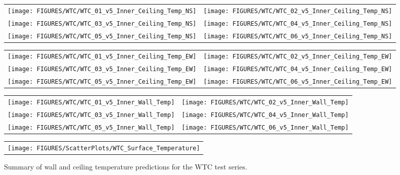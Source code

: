 \begin{figure}[p]
\begin{tabular*}{\textwidth}{l@{\extracolsep{\fill}}r}
\texttt{[image: FIGURES/WTC/WTC\_01\_v5\_Inner\_Ceiling\_Temp\_NS]} &
\texttt{[image: FIGURES/WTC/WTC\_02\_v5\_Inner\_Ceiling\_Temp\_NS]} \\
\texttt{[image: FIGURES/WTC/WTC\_03\_v5\_Inner\_Ceiling\_Temp\_NS]} &
\texttt{[image: FIGURES/WTC/WTC\_04\_v5\_Inner\_Ceiling\_Temp\_NS]} \\
\texttt{[image: FIGURES/WTC/WTC\_05\_v5\_Inner\_Ceiling\_Temp\_NS]} &
\texttt{[image: FIGURES/WTC/WTC\_06\_v5\_Inner\_Ceiling\_Temp\_NS]}
\end{tabular*}
\label{NIST_WTC_Inner_Ceiling_NS}
\end{figure}

\begin{figure}[p]
\begin{tabular*}{\textwidth}{l@{\extracolsep{\fill}}r}
\texttt{[image: FIGURES/WTC/WTC\_01\_v5\_Inner\_Ceiling\_Temp\_EW]} &
\texttt{[image: FIGURES/WTC/WTC\_02\_v5\_Inner\_Ceiling\_Temp\_EW]} \\
\texttt{[image: FIGURES/WTC/WTC\_03\_v5\_Inner\_Ceiling\_Temp\_EW]} &
\texttt{[image: FIGURES/WTC/WTC\_04\_v5\_Inner\_Ceiling\_Temp\_EW]} \\
\texttt{[image: FIGURES/WTC/WTC\_05\_v5\_Inner\_Ceiling\_Temp\_EW]} &
\texttt{[image: FIGURES/WTC/WTC\_06\_v5\_Inner\_Ceiling\_Temp\_EW]}
\end{tabular*}
\label{NIST_WTC_Inner_Ceiling_EW}
\end{figure}

\begin{figure}[p]
\begin{tabular*}{\textwidth}{l@{\extracolsep{\fill}}r}
\texttt{[image: FIGURES/WTC/WTC\_01\_v5\_Inner\_Wall\_Temp]} &
\texttt{[image: FIGURES/WTC/WTC\_02\_v5\_Inner\_Wall\_Temp]} \\
\texttt{[image: FIGURES/WTC/WTC\_03\_v5\_Inner\_Wall\_Temp]} &
\texttt{[image: FIGURES/WTC/WTC\_04\_v5\_Inner\_Wall\_Temp]} \\
\texttt{[image: FIGURES/WTC/WTC\_05\_v5\_Inner\_Wall\_Temp]} &
\texttt{[image: FIGURES/WTC/WTC\_06\_v5\_Inner\_Wall\_Temp]}
\end{tabular*}
\label{NIST_WTC_Inner_Wall}
\end{figure}

\begin{figure}[p]
\begin{center}
\begin{tabular}{c}
\texttt{[image: FIGURES/ScatterPlots/WTC\_Surface\_Temperature]}
\end{tabular}
\end{center}
\caption[Summary of wall and ceiling temperature predictions, WTC test series.]
{Summary of wall and ceiling temperature predictions for the WTC test series.}
\end{figure}


